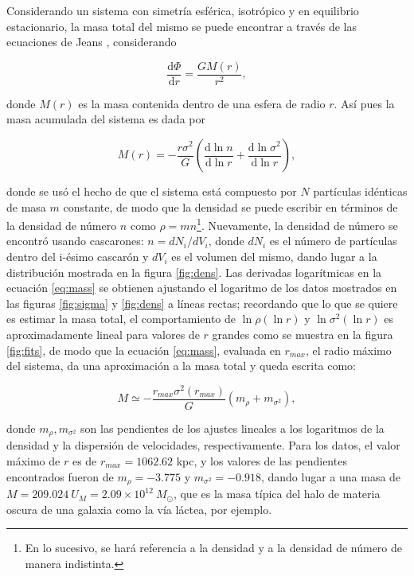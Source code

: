\documentclass[final,5p,times,twocolumn, nopreprintline]{elsarticle}
\numberwithin{equation}{section}
\begin{document}
Considerando un sistema con simetría esférica, isotrópico y en equilibrio estacionario, la masa total del mismo se puede encontrar a través de las ecuaciones de Jeans \cite{binney2011galactic}, considerando

\begin{equation}
\dfrac{\mathrm{d}\Phi}{\mathrm{d}r}=\dfrac{GM(r)}{r^2}, \label{eq:gauss}
\end{equation}

donde $M(r)$ es la masa contenida dentro de una esfera de radio $r$. Así pues la masa acumulada del sistema es dada por

\begin{equation}
M(r)=-\dfrac{r\sigma^2}{G}\left(\dfrac{\mathrm{d}\ln n}{\mathrm{d}\ln r}+\dfrac{\mathrm{d}\ln \sigma^2}{\mathrm{d}\ln r}\right), \label{eq:mass}
\end{equation}

donde se usó el hecho de que el sistema está compuesto por $N$ partículas idénticas de masa $m$ constante, de modo que la densidad se puede escribir en términos de la densidad de número $n$ como $\rho=mn$\footnote{En lo sucesivo, se hará referencia a la densidad y a la densidad de número de manera indistinta.}. Nuevamente, la densidad de número se encontró usando cascarones: $n=dN_i/dV_i$, donde $dN_i$ es el número de partículas dentro del i-ésimo cascarón y $dV_i$ es el volumen del mismo, dando lugar a la distribución mostrada en la figura \ref{fig:dens}. Las derivadas logarítmicas en la ecuación \ref{eq:mass} se obtienen ajustando el logaritmo de los datos mostrados en las figuras \ref{fig:sigma} y \ref{fig:dens} a líneas rectas; recordando que lo que se quiere es estimar la masa total, el comportamiento de $\ln\rho(\ln r)$ y $\ln\sigma^2(\ln r)$ es aproximadamente lineal para valores de $r $ grandes como se muestra en la figura \ref{fig:fits}, de modo que la ecuación \ref{eq:mass}, evaluada en $r_{max}$, el radio máximo del sistema, da una aproximación a la masa total y queda escrita como:

\begin{equation}
M\simeq-\dfrac{r_{max}\sigma^2(r_{max})}{G}\left(m_\rho+m_{\sigma^2}\right), \label{eq:mass}
\end{equation}

donde $m_\rho,m_{\sigma^2}$ son las pendientes de los ajustes lineales a los logaritmos de la densidad y la dispersión de velocidades, respectivamente. Para los datos, el valor máximo de $r$ es de $r_{max}=1062.62$ kpc, y los valores de las pendientes encontrados fueron de $m_\rho=-3.775$ y $m_{\sigma^2}=-0.918$, dando lugar a una masa de $M=209.024~U_M=2.09\times10^12~M_\odot$, que es la masa típica del halo de materia oscura de una galaxia como la vía láctea, por ejemplo.
\end{document}
